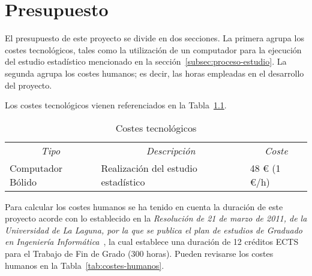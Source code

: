 \chapter{Presupuesto}
\label{cap:presupuesto}

El presupuesto de este proyecto se divide en dos secciones. La primera agrupa los costes tecnológicos, tales como la utilización de un computador para la ejecución del estudio estadístico mencionado en la sección~\ref{subsec:proceso-estudio}. La segunda agrupa los costes humanos; es decir, las horas empleadas en el desarrollo del proyecto.

Los costes tecnológicos vienen referenciados en la Tabla~\ref{tab:costes-tecnologicos}.

\begin{table}[ht]
\centering
\caption{Costes tecnológicos}
\label{tab:costes-tecnologicos}
\begin{tabular}{ccc}
\hline
\multirow{2}{*}{\textit{Tipo}}        & \multirow{2}{*}{\textit{Descripción}}                   & \multirow{2}{*}{\textit{Coste}}  \\
                                      &                                                         &                                  \\ \hline
\multicolumn{1}{l}{Computador Bólido} & \multicolumn{1}{l}{Realización del estudio estadístico} & \multicolumn{1}{l}{48 € (1 €/h)} \\ \hline
\end{tabular}
\end{table}

Para calcular los costes humanos se ha tenido en cuenta la duración de este proyecto acorde con lo establecido en la \textit{Resolución de 21 de marzo de 2011, de la Universidad de La Laguna, por la que se  publica el plan de estudios de Graduado en Ingeniería Informática}~\cite{resolucion_2011}, la cual establece una duración de 12 créditos ECTS para el Trabajo de Fin de Grado (300 horas). Pueden revisarse los costes humanos en la Tabla~\ref{tab:costes-humanos}.

\begin{table}[ht]
\centering
\caption{Costes humanos}
\label{tab:costes-humanos}
\end{table}

